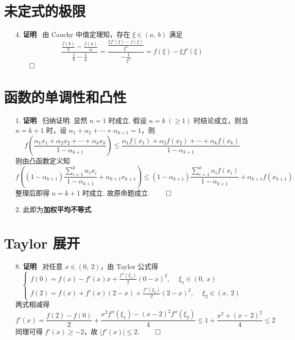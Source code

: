 \documentclass[11pt,oneside,fontset=fandol]{ctexbook} %
\begin{document}
\section{未定式的极限}

\begin{enumerate}
    \item[4.]
    \textbf{证明} \ 由 Cauchy 中值定理知，存在 $\xi \in (a,\ b)$ 满足
    \[
        \frac{\frac {f(b)} b - \frac {f(a)} a}{\frac 1 b - \frac 1 a} = \frac{\frac{\xi f'(\xi) - f(\xi)}{\xi^2}}{-\frac 1 {\xi^2}} = f(\xi) - \xi f'(\xi)
    \]
    $\hfill\qed$
\end{enumerate}

\section{函数的单调性和凸性}

\begin{enumerate}
    \item[1.]
    \textbf{证明} \ 归纳证明. 显然 $n = 1$ 时成立. 假设 $n=k \ (\geqslant 1)$ 时结论成立，则当 $n = k + 1$ 时，设 $\alpha_1 + \alpha_2 + \cdots + \alpha_{k+1} = 1$，则
    \[
        f(\frac{\alpha_1x_1 + \alpha_2x_2 + \cdots + \alpha_kx_k}{1-\alpha_{k+1}}) \leqslant \frac{\alpha_1f(x_1) + \alpha_2f(x_2) + \cdots + \alpha_kf(x_k)}{1-\alpha_{k+1}}
    \]
    则由凸函数定义知
    \[
        f\left( (1-\alpha_{k+1}) \frac{\sum_{i=1}^k \alpha_ix_i}{1-\alpha_{k+1}} + \alpha_{k+1}x_{k+1} \right) \leqslant (1-\alpha_{k+1}) \frac{\sum_{i=1}^k \alpha_if(x_i)}{1-\alpha_{k+1}} + \alpha_{k+1}f(x_{k+1})
    \]
    整理后即得 $n = k+1$ 时成立. 故原命题成立.
    $\hfill\qed$
    \item[2.]
    此即为\textbf{加权平均不等式}.
\end{enumerate}

\section{Taylor 展开}

\begin{enumerate}
    \item[8.]
    \textbf{证明} \ 对任意 $x \in (0,\ 2)$，由 Taylor 公式得
    \[
        \begin{cases}
            f(0) = f(x) - f'(x)x + \frac {f''(\xi_1)} 2 (0-x)^2 ,\ \quad \xi_1 \in (0,\ x) \\
            f(2) = f(x) + f'(x)(2-x) + \frac {f''(\xi_2)} 2 (2-x)^2 ,\ \quad \xi_2 \in (x,\ 2)
        \end{cases}
    \]
    两式相减得
    \[
        f'(x) = \frac {f(2)-f(0)} 2 + \frac {x^2 f''(\xi_1) - (x-2)^2 f''(\xi_2)} 4 \leqslant 1 + \frac{x^2 + (x-2)^2} 4 \leqslant 2
    \]
    同理可得 $f'(x) \geqslant -2$，故 $|f'(x)| \leqslant 2$.
    $\hfill\qed$
\end{enumerate}
\end{document}
